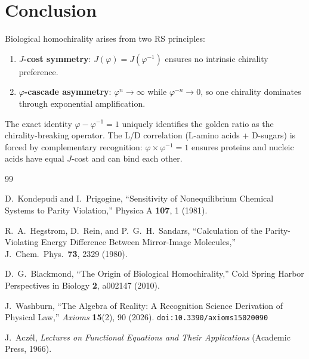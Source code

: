\documentclass[12pt,a4paper]{article}
\theoremstyle{definition}
\theoremstyle{remark}
\begin{document}
\section{Conclusion}
\label{sec:conclusion}

Biological homochirality arises from two RS principles:
\begin{enumerate}
  \item \textbf{$J$-cost symmetry}: $J(\varphi) = J(\varphi^{-1})$
  ensures no intrinsic chirality preference.
  \item \textbf{$\varphi$-cascade asymmetry}:
  $\varphi^n \to \infty$ while $\varphi^{-n} \to 0$, so one
  chirality dominates through exponential amplification.
\end{enumerate}

The exact identity $\varphi - \varphi^{-1} = 1$ uniquely identifies
the golden ratio as the chirality-breaking operator.  The L/D
correlation (L-amino acids + D-sugars) is forced by complementary
recognition: $\varphi \times \varphi^{-1} = 1$ ensures proteins and
nucleic acids have equal $J$-cost and can bind each other.

\begin{thebibliography}{99}

D.~Kondepudi and I.~Prigogine, ``Sensitivity of Nonequilibrium
Chemical Systems to Parity Violation,'' Physica A \textbf{107}, 1
(1981).

R.~A.~Hegstrom, D.~Rein, and P.~G.~H.~Sandars, ``Calculation of
the Parity-Violating Energy Difference Between Mirror-Image
Molecules,'' J.\ Chem.\ Phys.\ \textbf{73}, 2329 (1980).

D.~G.~Blackmond, ``The Origin of Biological Homochirality,''
Cold Spring Harbor Perspectives in Biology \textbf{2}, a002147
(2010).

J.~Washburn, ``The Algebra of Reality: A Recognition Science Derivation
of Physical Law,'' \emph{Axioms} \textbf{15}(2), 90 (2026).
\texttt{doi:10.3390/axioms15020090}

J.~Acz\'el, \emph{Lectures on Functional Equations and Their
Applications} (Academic Press, 1966).

\end{thebibliography}
\end{document}
